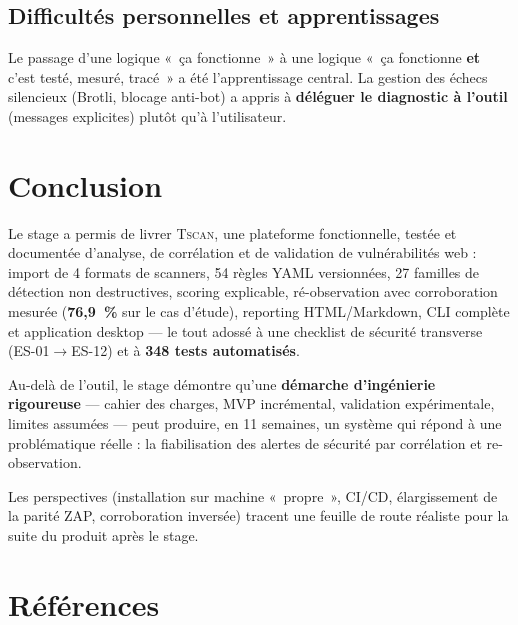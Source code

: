 \documentclass[11pt,a4paper]{report}
\newcommand{\tscan}{\textsc{Tscan}}
\begin{document}
\section{Difficultés personnelles et apprentissages}

Le passage d'une logique «~ça fonctionne~» à une logique «~ça fonctionne \textbf{et} c'est
testé, mesuré, tracé~» a été l'apprentissage central. La gestion des échecs silencieux
(Brotli, blocage anti-bot) a appris à \textbf{déléguer le diagnostic à l'outil} (messages
explicites) plutôt qu'à l'utilisateur.

\chapter{Conclusion}

Le stage a permis de livrer \tscan{}, une plateforme fonctionnelle, testée et documentée
d'analyse, de corrélation et de validation de vulnérabilités web : import de 4 formats de
scanners, 54 règles YAML versionnées, 27 familles de détection non destructives, scoring
explicable, ré-observation avec corroboration mesurée (\textbf{76,9~\%} sur le cas
d'étude), reporting HTML/Markdown, CLI complète et application desktop --- le tout adossé
à une checklist de sécurité transverse (ES-01$\rightarrow$ES-12) et à \textbf{348 tests
automatisés}.

Au-delà de l'outil, le stage démontre qu'une \textbf{démarche d'ingénierie rigoureuse} ---
cahier des charges, MVP incrémental, validation expérimentale, limites assumées --- peut
produire, en 11 semaines, un système qui répond à une problématique réelle : la
fiabilisation des alertes de sécurité par corrélation et re-observation.

Les perspectives (installation sur machine «~propre~», CI/CD, élargissement de la parité
ZAP, corroboration inversée) tracent une feuille de route réaliste pour la suite du
produit après le stage.

\chapter{Références}
\end{document}
